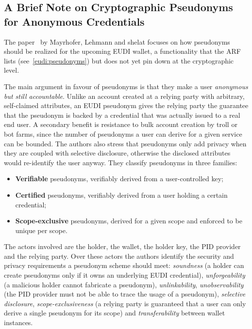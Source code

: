 \documentclass{article}
\begin{document}
\subsection{A Brief Note on Cryptographic Pseudonyms for Anonymous Credentials}
\label{cryptographicpseudonyms}
The paper~\cite{Mayrhofer2025BriefNote} by Mayrhofer, Lehmann and shelat focuses on how pseudonyms
should be realized for the upcoming EUDI wallet, a functionality that the ARF lists (see~\cref{eudi:pseudonyms})
but does not yet pin down at the cryptographic level.

The main argument in favour of pseudonyms is that they make a user \emph{anonymous but still accountable}.
Unlike an account created at a relying party with arbitrary, self-claimed attributes, an EUDI pseudonym gives
the relying party the guarantee that the pseudonym is backed by a credential that was actually issued to a real
end user. A secondary benefit is resistance to bulk account creation by troll or bot farms, since the number of
pseudonyms a user can derive for a given service can be bounded. The authors also stress that pseudonyms only
add privacy when they are coupled with selective disclosure, otherwise the disclosed attributes would re-identify
the user anyway. They classify pseudonyms in three families:
\begin{itemize}[noitemsep]
  \item \textbf{Verifiable} pseudonyms, verifiably derived from a user-controlled key;
  \item \textbf{Certified} pseudonyms, verifiably derived from a user holding a certain credential;
  \item \textbf{Scope-exclusive} pseudonyms, derived for a given scope and enforced to be unique per scope.
\end{itemize}

The actors involved are the holder, the wallet, the holder key, the PID provider and the relying party. Over these
actors the authors identify the security and privacy requirements a pseudonym scheme should meet: \emph{soundness}
(a holder can create pseudonyms only if it owns an underlying EUDI credential), \emph{unforgeability} (a malicious
holder cannot fabricate a pseudonym), \emph{unlinkability}, \emph{unobservability} (the PID provider must not be able
to trace the usage of a pseudonym), \emph{selective disclosure}, \emph{scope-exclusiveness} (a relying party is
guaranteed that a user can only derive a single pseudonym for its scope) and \emph{transferability} between wallet
instances.
\end{document}
